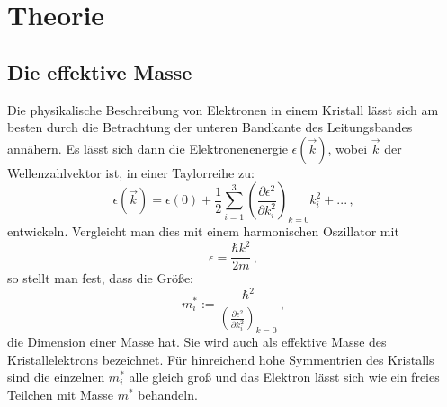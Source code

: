 \section{Theorie}
\subsection{Die effektive Masse}
Die physikalische Beschreibung von Elektronen in einem Kristall lässt sich am besten durch die Betrachtung der unteren Bandkante des Leitungsbandes annähern. Es lässt sich dann die Elektronenenergie $\epsilon(\vec{k})$, wobei $\vec{k}$ der Wellenzahlvektor ist, in einer Taylorreihe zu:
\begin{equation}
\epsilon(\vec{k})=\epsilon\left(0\right)+\frac{1}{2}\sum_{i=1}^3\left(\frac{\partial\epsilon^2}{\partial k_i^2}\right)_{k=0}k_i^2+...\,,
\end{equation}
entwickeln.
Vergleicht man dies mit einem harmonischen Oszillator mit
\begin{equation}
  \epsilon=\frac{\hbar k^2}{2m}\,,
\end{equation}
so stellt man fest, dass die Größe:
\begin{equation}
m_i^*:=\frac{\hbar^2}{\left(\frac{\partial\epsilon^2}{\partial k_i^2}\right)_{k=0}}\,,
\end{equation}
die Dimension einer Masse hat. Sie wird auch als effektive Masse des Kristallelektrons bezeichnet.
Für hinreichend hohe Symmentrien des Kristalls sind die einzelnen $m_i^*$ alle gleich groß und das Elektron lässt sich wie ein freies Teilchen mit Masse $m^*$ behandeln.
